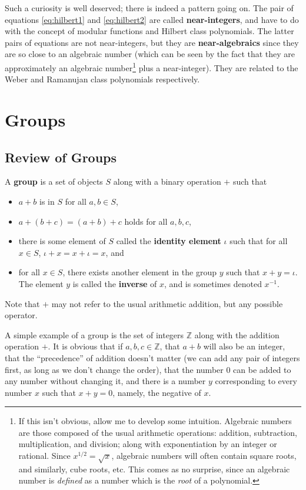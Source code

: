 \documentclass{microdoc}
\newcommand{\defn}[1]{\textbf{#1}}
\begin{document}
Such a curiosity is well deserved; there is indeed a pattern going
on. The pair of equations \eqref{eq:hilbert1} and \eqref{eq:hilbert2}
are called \defn{near-integers}, and have to do with the concept of
modular functions and Hilbert class polynomials. The latter pairs of
equations are not near-integers, but they are \defn{near-algebraics}
since they are so close to an algebraic number (which can be seen by
the fact that they are approximately an algebraic number\footnote{If
  this isn't obvious, allow me to develop some intuition. Algebraic
  numbers are those composed of the usual arithmetic operations:
  addition, subtraction, multiplication, and division; along with
  exponentiation by an integer or rational. Since $x^{1/2}=\sqrt{x}$,
  algebraic numbers will often contain square roots, and similarly,
  cube roots, etc. This comes as no surprise, since an algebraic
  number is \emph{defined} as a number which is the \emph{root} of a
  polynomial.} plus a near-integer). They are related to the Weber and
Ramanujan class polynomials respectively.

\section{Groups}
\subsection{Review of Groups}
A \defn{group} is a set of objects $S$ along with a binary operation $+$
such that
\begin{itemize}
  \item $a+b$ is in $S$ for all $a,b\in S$,
  \item $a+(b+c) = (a+b)+c$ holds for all $a,b,c$,
  \item there is some element of $S$ called the \defn{identity
    element} $\iota$ such that for all $x\in S$, $\iota+x = x+\iota = x$, and
  \item for all $x\in S$, there exists another element in the group
  $y$ such that $x+y = \iota$. The element $y$ is called the
  \defn{inverse} of $x$, and is sometimes denoted $x^{-1}$.
\end{itemize}
Note that $+$ may not refer to the usual arithmetic addition, but any
possible operator.

A simple example of a group is the set of integers $\mathbb{Z}$ along
with the addition operation $+$. It is obvious that if
$a,b,c\in\mathbb{Z}$, that $a+b$ will also be an integer, that the
``precedence'' of addition doesn't matter (we can add any pair of
integers first, as long as we don't change the order), that the number
$0$ can be added to any number without changing it, and there is a
number $y$ corresponding to every number $x$ such that $x+y=0$,
namely, the negative of $x$.
\end{document}
